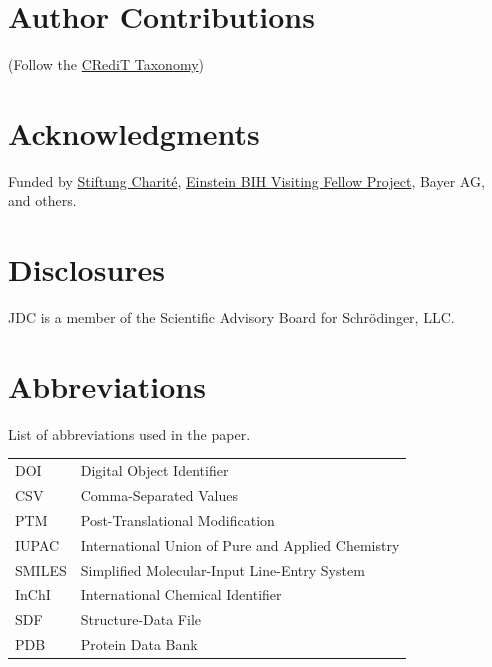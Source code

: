\documentclass[9pt,lineno]{elife}
\begin{document}
\section{Author Contributions}

(Follow the \href{http://www.cell.com/pb/assets/raw/shared/guidelines/CRediT-taxonomy.pdf}{CRediT Taxonomy})

\section{Acknowledgments}
Funded by \href{https://www.stiftung-charite.de/}{Stiftung Charité}, \href{https://www.einsteinfoundation.de/en/people-projects/einstein-bih-visiting-fellows/john-chodera/}{Einstein BIH Visiting Fellow Project}, Bayer AG, and others.

\section{Disclosures}

JDC is a member of the Scientific Advisory Board for Schr\"{o}dinger, LLC.

\section{Abbreviations}
List of abbreviations used in the paper.
\begin{table}[H]
    \centering
    \begin{tabular}{l l}
        DOI & Digital Object Identifier \\
        CSV & Comma-Separated Values\\
        PTM & Post-Translational Modification \\
        IUPAC & International Union of Pure and Applied Chemistry \\
        SMILES & Simplified Molecular-Input Line-Entry System \\
        InChI & International Chemical Identifier \\
        SDF & Structure-Data File \\
        PDB & Protein Data Bank \\
    \end{tabular}
\end{table}

\nocite{*} %



\appendix
\end{document}
